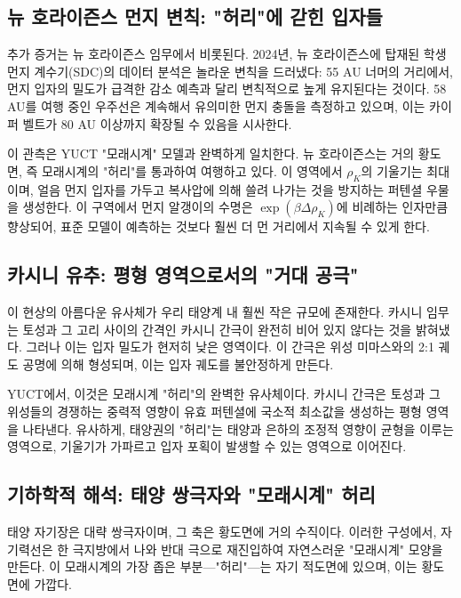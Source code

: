 \documentclass[11pt,a4paper]{article}
\theoremstyle{remark}
\begin{document}
	\subsection{뉴 호라이즌스 먼지 변칙: "허리"에 갇힌 입자들}
	\label{subsec:coord:newhorizons}
	
	추가 증거는 뉴 호라이즌스 임무에서 비롯된다. 2024년, 뉴 호라이즌스에 탑재된 학생 먼지 계수기(SDC)의 데이터 분석은 놀라운 변칙을 드러냈다: 55 AU 너머의 거리에서, 먼지 입자의 밀도가 급격한 감소 예측과 달리 변칙적으로 높게 유지된다는 것이다. 58 AU를 여행 중인 우주선은 계속해서 유의미한 먼지 충돌을 측정하고 있으며, 이는 카이퍼 벨트가 80 AU 이상까지 확장될 수 있음을 시사한다.
	
	이 관측은 YUCT "모래시계" 모델과 완벽하게 일치한다. 뉴 호라이즌스는 거의 황도면, 즉 모래시계의 "허리"를 통과하여 여행하고 있다. 이 영역에서 \(\rho_K\)의 기울기는 최대이며, 얼음 먼지 입자를 가두고 복사압에 의해 쓸려 나가는 것을 방지하는 퍼텐셜 우물을 생성한다. 이 구역에서 먼지 알갱이의 수명은 \(\exp(\beta \Delta \rho_K)\)에 비례하는 인자만큼 향상되어, 표준 모델이 예측하는 것보다 훨씬 더 먼 거리에서 지속될 수 있게 한다.
	
	\subsection{카시니 유추: 평형 영역으로서의 "거대 공극"}
	\label{subsec:coord:cassini}
	
	이 현상의 아름다운 유사체가 우리 태양계 내 훨씬 작은 규모에 존재한다. 카시니 임무는 토성과 그 고리 사이의 간격인 카시니 간극이 완전히 비어 있지 않다는 것을 밝혀냈다. 그러나 이는 입자 밀도가 현저히 낮은 영역이다. 이 간극은 위성 미마스와의 2:1 궤도 공명에 의해 형성되며, 이는 입자 궤도를 불안정하게 만든다.
	
	YUCT에서, 이것은 모래시계 "허리"의 완벽한 유사체이다. 카시니 간극은 토성과 그 위성들의 경쟁하는 중력적 영향이 유효 퍼텐셜에 국소적 최소값을 생성하는 평형 영역을 나타낸다. 유사하게, 태양권의 "허리"는 태양과 은하의 조정적 영향이 균형을 이루는 영역으로, 기울기가 가파르고 입자 포획이 발생할 수 있는 영역으로 이어진다.
	
	\subsection{기하학적 해석: 태양 쌍극자와 "모래시계" 허리}
	\label{subsec:coord:dipole_geometry}
	
	태양 자기장은 대략 쌍극자이며, 그 축은 황도면에 거의 수직이다. 이러한 구성에서, 자기력선은 한 극지방에서 나와 반대 극으로 재진입하여 자연스러운 "모래시계" 모양을 만든다. 이 모래시계의 가장 좁은 부분—"허리"—는 자기 적도면에 있으며, 이는 황도면에 가깝다.
	
\end{document}
